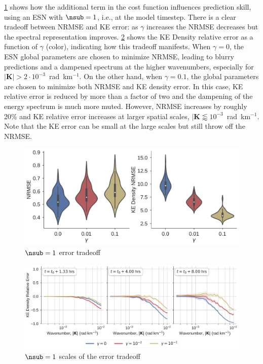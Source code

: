 \cref{fig:esn-error-vs-gamma} shows how the additional term in the cost function influences
prediction skill, using an ESN with $\nsub=1$, i.e., at the model timestep.
There is a clear tradeoff between NRMSE and KE error: as $\gamma$ increases the
NRMSE decreases but the spectral representation improves.
\cref{fig:esn-ke-error-vs-gamma} shows the KE Density relative error as a function of $\gamma$
(color), indicating how this tradeoff manifests.
When $\gamma=0$, the ESN global parameters are chosen to minimize NRMSE, leading
to blurry predictions and a dampened spectrum at the higher wavenumbers,
especially for $|\mathbf{K}| > 2\cdot10^{-3}$~rad~km$^{-1}$.
On the other hand, when $\gamma = 0.1$, the global parameters are chosen to
minimize both NRMSE and KE density error.
In this case, KE relative error is reduced by more than a factor of two and the
dampening of the energy spectrum is much more muted.
However, NRMSE increases by roughly 20\% and KE relative error increases at
larger spatial scales,
$|\mathbf{K} \lessapprox 10^{-3}$~rad~km$^{-1}$.
Note that the KE error can be small at the large scales but still throw off the
NRMSE.

\begin{figure}
    \centering
    \includegraphics[width=.8\textwidth]{../figures/rc_nrmse_and_kenrmse_nsub01.pdf}
    \caption{$\nsub=1$ error tradeoff}
    \label{fig:esn-error-vs-gamma}
\end{figure}

\begin{figure}
    \centering
    \includegraphics[width=.8\textwidth]{../figures/rc_ke_rel_err_nsub01.pdf}
    \caption{$\nsub=1$ scales of the error tradeoff}
    \label{fig:esn-ke-error-vs-gamma}
\end{figure}

